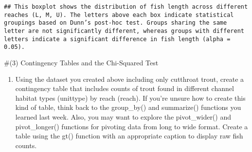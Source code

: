 \documentclass[
]{article}
\providecommand{\tightlist}{%
  \setlength{\itemsep}{0pt}\setlength{\parskip}{0pt}}
\begin{document}
\begin{verbatim}
## This boxplot shows the distribution of fish length across different reaches (L, M, U). The letters above each box indicate statistical groupings based on Dunn’s post-hoc test. Groups sharing the same letter are not significantly different, whereas groups with different letters indicate a significant difference in fish length (alpha = 0.05).
\end{verbatim}

\#(3) Contingency Tables and the Chi-Squared Test

\begin{enumerate}
\def\labelenumi{\alph{enumi}.}
\tightlist
\item
  Using the dataset you created above including only cutthroat trout,
  create a contingency table that includes counts of trout found in
  diﬀerent channel habitat types (unittype) by reach (reach). If you're
  unsure how to create this kind of table, think back to the group\_by()
  and summarize() functions you learned last week. Also, you may want to
  explore the pivot\_wider() and pivot\_longer() functions for pivoting
  data from long to wide format. Create a table using the gt() function
  with an appropriate caption to display raw fish counts.
\end{enumerate}
\end{document}
